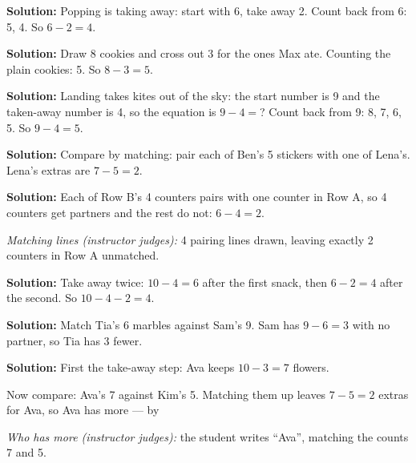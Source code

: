 \documentclass[12pt]{article}
\begin{document}




\textbf{Solution:} Popping is taking away: start with 6, take away 2. Count
back from 6: 5, 4. So $6-2=4$. 


\textbf{Solution:} Draw 8 cookies and cross out 3 for the ones Max ate.
Counting the plain cookies: 5. So $8-3=5$. 


\textbf{Solution:} Landing takes kites out of the sky: the start number is 9
and the taken-away number is 4, so the equation is $9 - 4 = {}$? Count back
from 9: 8, 7, 6, 5. So $9-4=5$. 


\textbf{Solution:} Compare by matching: pair each of Ben's 5 stickers with
one of Lena's. Lena's extras are $7-5=2$. 


\textbf{Solution:} Each of Row B's 4 counters pairs with one counter in
Row A, so 4 counters get partners and the rest do not: $6-4=2$.

\emph{Matching lines (instructor judges):} 4 pairing lines drawn, leaving
exactly 2 counters in Row A unmatched.


\textbf{Solution:} Take away twice: $10-4=6$ after the first snack, then
$6-2=4$ after the second. So $10-4-2=4$. 


\textbf{Solution:} Match Tia's 6 marbles against Sam's 9. Sam has $9-6=3$
with no partner, so Tia has 3 fewer. 


\textbf{Solution:} First the take-away step: Ava keeps $10-3=7$ flowers.

Now compare: Ava's 7 against Kim's 5. Matching them up leaves $7-5=2$ extras
for Ava, so Ava has more --- by 

\emph{Who has more (instructor judges):} the student writes ``Ava'', matching
the counts 7 and 5.
\end{document}
